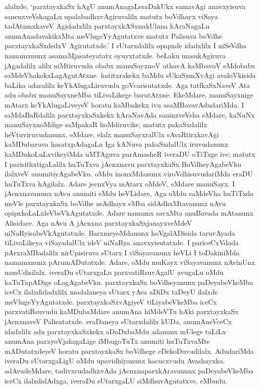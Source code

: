 alalxde, `parxtayxkaSx hAgU anumAnagaLeraDakUkx samavAgi anavxyisuva sanenxveVshagaLu upalabadhxvAgiruvalilx matutx boVdhayx viSaya tadAtamxkaveV Agidadxlilx parxtayxkASxnukUlana kAraNagaLu anumAnadavakikxMta meVlugeYyAgutatxve matutx Palisuva boVdhe parxtayxkaSxdedxV Agirutatxde.' I sUtarxdalilx opapxde idadxlilx I niSeVdha namamxnunx asamaMjasateyatatx oyuyxtatxde. beLaku masukAgiruva jAgadalilx alilx niMtiruvudu obabx manuSayxnoV athavA kaMbavoV eMdobabx saMdeVhakokxLagAgutAtxne. hatitxrakekx baMdu sUkaSxmXvAgi avaloVkisida baLika adaralilx keYkAlugaLiruvudu goVcarisutatxde. Aga tatfkaSxNaveV Ata adu obabx manuSayxneMba tiLivaLikege barutAtxne. EkeMdare, manuSayxnige mAtarx keYkAlugaLiveyeV horatu kaMbakekx ivu asaMBavavAdudariMda. I saMdaBaRdalilx parxtayxkaSxkekx kAraNavAda saninxveVsha eMdare, kaNuNx manuSayxnoMdige saMpakaR hoMdiruvike, matutx pakaSxdalilx heVtuviruvudanunx, eMdare, elalx manuSayxralUlx sAvaRtirxkavAgi kaMDubaruva hasatxpAdagaLu Iga kANuva pakaSxdalUlx iruvudanunx kaMDukoLuLxvikeyiMda uMTAguva parAmasheR iveraDU oTiTxge ive; matutx I parisithxtigaLalilx huTuTxva jAcnxnavu parxtayxkaSx BoVdheyAgabeVku ilalxveV anumitiyAgabeVku. oMdu inonxMdanunx viroVdhisuvudariMda eraDU huTuTxva hAgilalx. Adare jecnxVya mAtarx oMdeV, eMdare manuSayx. I jAcnxnavanunx nAvu anumiti eMdu heVLidare, Aga oMdu saMdeVha huTiTxda meVle parxtayxkaSx boVdhe asAdhayx eMba sidAdhxMtavanunx nAvu opipxkoLaLxleVbeVkAgutatxde. Adare namamx savxMta anuBavada mAtanunx Alisidare. Aga nAvu A jAcnxna parxtayxkaSxjanayxveMdeV niNaRyisabeVkAgutatxde. BarxmeyoMdanunx hoVgalADisida taruvAyada tiLivaLikeya viSayadalUlx ideV niNaRya anavxyisutatxde. I pariceCxVdada pArxraMBadalilx nirUpisiruva sUtarx I viSayavanunx heVLi I toDakiniMda namamxnunx pArumADutatxde. Adare, oMdu muKayx viSayavanunx nAvinUnx namUdisilalx. iveraDu sUtarxgaLu parxvatiRsuvAgalU avugaLu oMdu kaTuTxpADige oLagAgabeVku. parxtayxkaSx boVdheyanunx paDeyabeVkeMba iceCx ilalxdidadxlilx modalaneya sUtarx yAva aDiDx taDeyU ilalxde meVlugeYyAgutatxde. parxtayxkaSxvAgiyeV tiLiyabeVkeMba iceCx parxvatiRsuvudu kaMDubaMdare anumAna hiMdeVTu hAki parxtayxkaSx jAcnxnaveV Palisutatxde. eraDaneya sUtarxdalilx kUDa, anumAneVceCx idadxlilx adu parxtayxkaSxkekx aDaDxbaMdu adanunx mUlege taLiLx anumAna parxyoVjakagaLige iMbugoTuTx anumiti huTuTxvaMte mADutatxdeyeV horatu parxtayxkaSx boVdhege eDekoDuvudilalx. AdudariMda iveraDu sUtarxgaLigU oMdu upavidhiyanunx hacucxvudu Avashayxka. adAvudeMdare, tadivxrudadhxvAda jAcnxnaparxkAravanunx paDeyabeVkeMba iceCx ilalxdidAdxga, iveraDu sUtarxgaLU siMdhuvAgutatxve, eMbudu.

